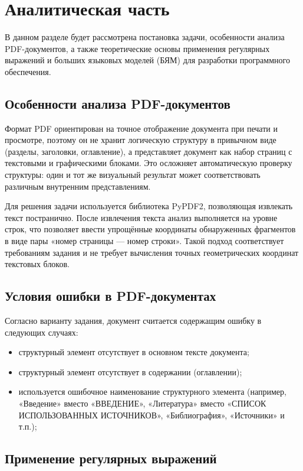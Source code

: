 \chapter{Аналитическая часть}

В данном разделе будет рассмотрена постановка задачи, особенности анализа PDF-документов,
а также теоретические основы применения регулярных выражений и больших языковых моделей (БЯМ)
для разработки программного обеспечения.

\section{Особенности анализа PDF-документов}

Формат PDF ориентирован на точное отображение документа при печати и просмотре,
поэтому он не хранит логическую структуру в привычном виде (разделы, заголовки, оглавление),
а представляет документ как набор страниц с текстовыми и графическими блоками.
Это осложняет автоматическую проверку структуры: один и тот же визуальный результат
может соответствовать различным внутренним представлениям.

Для решения задачи используется библиотека PyPDF2, позволяющая извлекать текст постранично.
После извлечения текста анализ выполняется на уровне строк, что позволяет ввести упрощённые координаты
обнаруженных фрагментов в виде пары «номер страницы --- номер строки».
Такой подход соответствует требованиям задания и не требует вычисления точных геометрических координат
текстовых блоков.

\section{Условия ошибки в PDF-документах}

Согласно варианту задания, документ считается содержащим ошибку в следующих случаях:
\begin{itemize}
    \item структурный элемент отсутствует в основном тексте документа;
    \item структурный элемент отсутствует в содержании (оглавлении);
    \item используется ошибочное наименование структурного элемента
    (например, «Введение» вместо «ВВЕДЕНИЕ», «Литература» вместо
    «СПИСОК ИСПОЛЬЗОВАННЫХ ИСТОЧНИКОВ», «Библиография», «Источники» и т.п.);
\end{itemize}

\section{Применение регулярных выражений}


